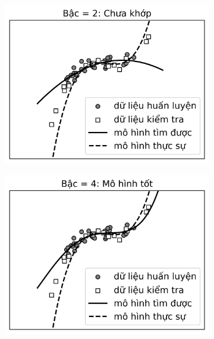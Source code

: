\begin{figure}[t]
    \begin{subfigure}{0.49\textwidth}
    \includegraphics[width=0.99\linewidth]{ebookML_src/src/overfitting/poly2.png}
    \caption{}
    \label{fig:15_polyrega}
    \end{subfigure}
    \begin{subfigure}{0.49\textwidth}
    \includegraphics[width=0.99\linewidth]{ebookML_src/src/overfitting/poly4.png}
    \caption{} 
    \label{fig:15_polyregb} 
    \end{subfigure}

\end{figure}
